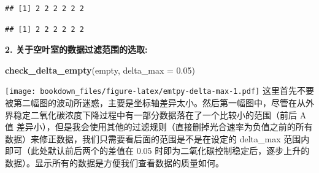 \documentclass[
]{krantz}
\makeatletter
\newenvironment{Shaded}{\begin{snugshade}}{\end{snugshade}}
\newcommand{\DataTypeTok}[1]{\textcolor[rgb]{0.13,0.29,0.53}{#1}}
\newcommand{\DecValTok}[1]{\textcolor[rgb]{0.00,0.00,0.81}{#1}}
\newcommand{\FloatTok}[1]{\textcolor[rgb]{0.00,0.00,0.81}{#1}}
\newcommand{\KeywordTok}[1]{\textcolor[rgb]{0.13,0.29,0.53}{\textbf{#1}}}
\newcommand{\NormalTok}[1]{#1}
\newcommand{\OperatorTok}[1]{\textcolor[rgb]{0.81,0.36,0.00}{\textbf{#1}}}
\newcommand{\StringTok}[1]{\textcolor[rgb]{0.31,0.60,0.02}{#1}}
\newenvironment{kframe}{%
\medskip{}
\setlength{\fboxsep}{.8em}
 \def\at@end@of@kframe{}%
 \ifinner\ifhmode%
  \def\at@end@of@kframe{\end{minipage}}%
  \begin{minipage}{\columnwidth}%
 \fi\fi%
 \def\FrameCommand##1{\hskip\@totalleftmargin \hskip-\fboxsep
 \colorbox{shadecolor}{##1}\hskip-\fboxsep
     \hskip-\linewidth \hskip-\@totalleftmargin \hskip\columnwidth}%
 \MakeFramed {\advance\hsize-\width
   \@totalleftmargin\z@ \linewidth\hsize
   \@setminipage}}%
 {\par\unskip\endMakeFramed%
 \at@end@of@kframe}
\renewenvironment{Shaded}{\begin{kframe}}{\end{kframe}}
\makeatother
\begin{document}
\begin{Shaded}
\end{Shaded}

\begin{verbatim}
## [1] 2 2 2 2 2 2
\end{verbatim}

\begin{Shaded}
\end{Shaded}

\begin{verbatim}
## [1] 2 2 2 2 2 2
\end{verbatim}

\textbf{2. 关于空叶室的数据过滤范围的选取:}

\begin{Shaded}
\begin{Highlighting}[]
\KeywordTok{check\_delta\_empty}\NormalTok{(empty, }\DataTypeTok{delta\_max =} \FloatTok{0.05}\NormalTok{)}
\end{Highlighting}
\end{Shaded}

\texttt{[image: bookdown\_files/figure-latex/emtpy-delta-max-1.pdf]}
这里首先不要被第二幅图的波动所迷惑，主要是坐标轴差异太小。然后第一幅图中，尽管在从外界稳定二氧化碳浓度下降过程中有一部分数据落在了一个比较小的范围（前后 A 值 差异小），但是我会使用其他的过滤规则（直接删掉光合速率为负值之前的所有数据）来修正数据，我们只需要看后面的范围是不是在设定的 delta\_max 范围内即可（此处默认前后两个的差值在 0.05 时即为二氧化碳控制稳定后，逐步上升的数据）。显示所有的数据是方便我们查看数据的质量如何。
\end{document}
